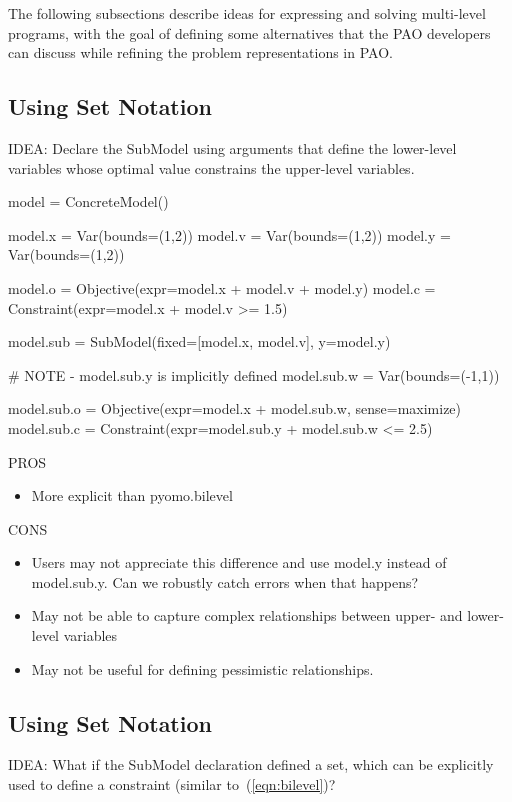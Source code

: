 The following subsections describe ideas for expressing and solving multi-level programs, with the
goal of defining some alternatives that the PAO developers can discuss while refining the 
problem representations in PAO.

\subsection{Using Set Notation}

IDEA: Declare the SubModel using arguments that define the lower-level variables whose
optimal value constrains the upper-level variables.

\begin{qlisting}
model = ConcreteModel()

model.x = Var(bounds=(1,2))
model.v = Var(bounds=(1,2))
model.y = Var(bounds=(1,2))

model.o = Objective(expr=model.x + model.v + model.y)
model.c = Constraint(expr=model.x + model.v >= 1.5)

model.sub = SubModel(fixed=[model.x, model.v], y=model.y)

# NOTE - model.sub.y is implicitly defined
model.sub.w = Var(bounds=(-1,1))

model.sub.o = Objective(expr=model.x + model.sub.w, sense=maximize)
model.sub.c = Constraint(expr=model.sub.y + model.sub.w <= 2.5)
\end{qlisting}

\noindent PROS
\begin{itemize}
\item More explicit than pyomo.bilevel
\end{itemize}
CONS
\begin{itemize}
\item Users may not appreciate this difference and use model.y instead of model.sub.y.  Can we robustly catch errors when that happens?
\item May not be able to capture complex relationships between upper- and lower-level variables
\item May not be useful for defining pessimistic relationships.
\end{itemize}


\subsection{Using Set Notation}

IDEA:  What if the SubModel declaration defined a set, which can be explicitly used to
define a constraint (similar to~(\ref{eqn:bilevel})?

